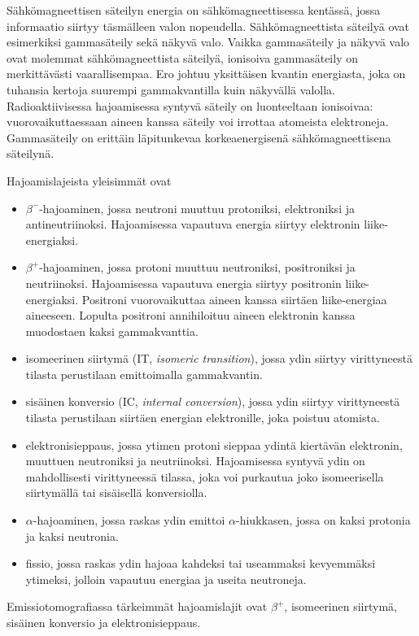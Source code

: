 Sähkömagneettisen säteilyn energia on sähkömagneettisessa kentässä, jossa informaatio siirtyy täsmälleen valon nopeudella.\cite{cherry_basic_2012} Sähkömagneettista säteilyä ovat esimerkiksi gammasäteily sekä näkyvä valo. Vaikka gammasäteily ja näkyvä valo ovat molemmat sähkömagneettista säteilyä, ionisoiva gammasäteily on merkittävästi vaarallisempaa. Ero johtuu yksittäisen kvantin energiasta, joka on tuhansia kertoja suurempi gammakvantilla kuin näkyvällä valolla. Radioaktiivisessa hajoamisessa syntyvä säteily on luonteeltaan ionisoivaa: vuorovaikuttaessaan aineen kanssa säteily voi irrottaa atomeista elektroneja\cite{cherry_interaction_2012}. Gammasäteily on erittäin läpitunkevaa korkeaenergisenä sähkömagneettisena säteilynä.

Hajoamislajeista yleisimmät ovat\cite{cherry_modes_2012}
\begin{itemize}
    \item $\beta^{-}$-hajoaminen, jossa neutroni muuttuu protoniksi, elektroniksi ja antineutriinoksi.  Hajoamisessa vapautuva energia siirtyy elektronin liike-energiaksi.
    \item $\beta^{+}$-hajoaminen, jossa protoni muuttuu neutroniksi, positroniksi ja neutriinoksi. Hajoamisessa vapautuva energia siirtyy positronin liike-energiaksi. Positroni vuorovaikuttaa aineen kanssa siirtäen liike-energiaa aineeseen. Lopulta positroni annihiloituu aineen elektronin kanssa muodostaen kaksi gammakvanttia.
    \item isomeerinen siirtymä (IT, \textit{isomeric transition}), jossa ydin siirtyy virittyneestä tilasta perustilaan emittoimalla gammakvantin.
    \item sisäinen konversio (IC, \textit{internal conversion}), jossa ydin siirtyy virittyneestä tilasta perustilaan siirtäen energian elektronille, joka poistuu atomista.
    \item elektronisieppaus, jossa ytimen protoni sieppaa ydintä kiertävän elektronin, muuttuen neutroniksi ja neutriinoksi. Hajoamisessa syntyvä ydin on mahdollisesti virittyneessä tilassa, joka voi purkautua joko isomeerisella siirtymällä tai sisäisellä konversiolla.
    \item $\alpha$-hajoaminen, jossa raskas ydin emittoi $\alpha$-hiukkasen, jossa on kaksi protonia ja kaksi neutronia.
    \item fissio, jossa raskas ydin hajoaa kahdeksi tai useammaksi kevyemmäksi ytimeksi, jolloin vapautuu energiaa ja useita neutroneja.
\end{itemize}
Emissiotomografiassa tärkeimmät hajoamislajit ovat $\beta^{+}$, isomeerinen siirtymä, sisäinen konversio ja elektronisieppaus\cite{cherry_modes_2012}.

